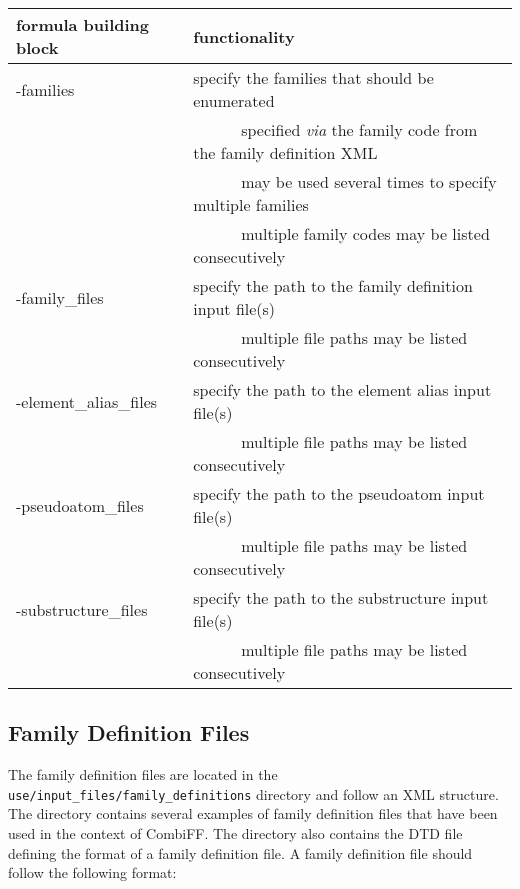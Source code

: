 \documentclass[a4paper,11pt]{article}
\newcommand{\tabitem}{~~\llap{\textbullet}~~}
\begin{document}
\begin{table}[H]
\begin{tabular}{>{\ttfamily\raggedright}p{}|p{}}
    \hline
    \textnormal{formula building block} & functionality \\
    \hline\hline
    -families & specify the families that should be enumerated\\
              & ~~\tabitem specified \textit{via} the family code from the family definition XML\\
              & ~~\tabitem may be used several times to specify multiple families\\
              & ~~\tabitem multiple family codes may be listed consecutively\\
    \hline
    -family\_files & specify the path to the family definition input file(s)\\
                   & ~~\tabitem multiple file paths may be listed consecutively\\
    \hline
    -element\_alias\_files & specify the path to the element alias input file(s)\\
                   & ~~\tabitem multiple file paths may be listed consecutively\\
    \hline
    -pseudoatom\_files & specify the path to the pseudoatom input file(s)\\
                   & ~~\tabitem multiple file paths may be listed consecutively\\
    \hline
    -substructure\_files & specify the path to the substructure input file(s)\\
                   & ~~\tabitem multiple file paths may be listed consecutively\\
    \hline
\end{tabular}
\end{table}

\subsection{Family Definition Files}\label{sec:family}

The family definition files are located in the \texttt{use/input\_files/family\_definitions} directory and follow an XML structure. The directory contains several examples of family definition files that have been used in the context of CombiFF. The directory also contains the DTD file defining the format of a family definition file. A family definition file should follow the following format:
\end{document}
